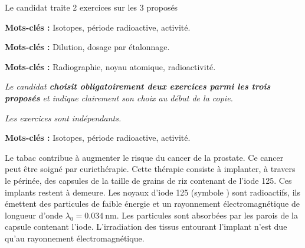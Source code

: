 \newpage
\vAligne{-70pt}

\begin{boite}
  \centering
  Le candidat traite  2 exercices sur les 3 proposés

  \begin{multicols}{3}
    \begin{boite}
      \begin{center}
      \end{center}
      \vspace*{-12pt}
      \textbf{Mots-clés :} Isotopes, période radioactive, activité.
    \end{boite}
    \begin{boite}
      \begin{center}
      \end{center}
      \vspace*{-12pt}
      \textbf{Mots-clés :} Dilution, dosage par étalonnage.
    \end{boite}
    \begin{boite}
      \begin{center}
      \end{center}
      \vspace*{-12pt}
      \textbf{Mots-clés :} Radiographie, noyau atomique, radioactivité.
    \end{boite}
  \end{multicols}
\end{boite}

\textit{
  Le candidat \textbf{choisit obligatoirement deux exercices parmi les trois proposés} et indique clairement son choix au début de la copie.
}
  
\textit{
  Les exercices sont indépendants.
}
\vspace*{24pt}


\vspace*{-4pt}
\label{exo:curietherapie}

\textbf{Mots-clés :} Isotopes, période radioactive, activité.
\medskip

Le tabac contribue à augmenter le risque du cancer de la prostate.
Ce cancer peut être soigné par curiethérapie.
Cette thérapie consiste à implanter, à travers le périnée, des capsules de la taille de grains de riz contenant de l'iode 125.
Ces implants restent à demeure. 
Les noyaux d'iode 125 (symbole ) sont radioactifs, ils émettent des particules de faible énergie et un rayonnement électromagnétique de longueur d'onde 
$\lambda_0 = \qty{0,034}{\nm}$.
Les particules sont absorbées par les parois de la capsule contenant l'iode.
L'irradiation des tissus entourant l'implant n'est due qu'au rayonnement électromagnétique.

